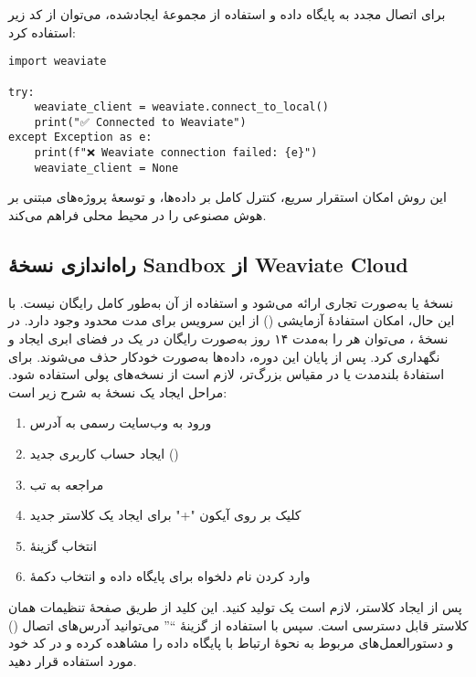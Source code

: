 \documentclass{article}
\begin{document}
برای اتصال مجدد به پایگاه داده و استفاده از مجموعهٔ ایجادشده، می‌توان از کد زیر استفاده کرد:

\begin{latin}
\begin{lstlisting}
import weaviate

try:
    weaviate_client = weaviate.connect_to_local()
    print("✅ Connected to Weaviate")
except Exception as e:
    print(f"❌ Weaviate connection failed: {e}")
    weaviate_client = None
\end{lstlisting}
\end{latin}

این روش امکان استقرار سریع، کنترل کامل بر داده‌ها، و توسعهٔ پروژه‌های مبتنی بر هوش مصنوعی را در محیط محلی فراهم می‌کند.
\subsection{راه‌اندازی نسخهٔ Sandbox از Weaviate Cloud}
نسخهٔ  یا  به‌صورت تجاری ارائه می‌شود و استفاده از آن به‌طور کامل رایگان نیست.
با این حال، امکان استفادهٔ آزمایشی () از این سرویس برای مدت محدود وجود دارد.
در نسخهٔ ، می‌توان هر  را به‌مدت ۱۴ روز به‌صورت رایگان در یک  در فضای ابری  ایجاد و نگهداری کرد.
پس از پایان این دوره، داده‌ها به‌صورت خودکار حذف می‌شوند.
برای استفادهٔ بلندمدت یا در مقیاس بزرگ‌تر، لازم است از نسخه‌های پولی  استفاده شود.
مراحل ایجاد یک نسخهٔ  به شرح زیر است:
\begin{enumerate}
\item ورود به وب‌سایت رسمی  به آدرس 
\item ایجاد حساب کاربری جدید ()
\item مراجعه به تب 
\item کلیک بر روی آیکون "+" برای ایجاد یک کلاستر جدید
\item انتخاب گزینهٔ 
\item وارد کردن نام دلخواه برای پایگاه داده و انتخاب دکمهٔ 
\end{enumerate}

پس از ایجاد کلاستر، لازم است یک  تولید کنید.
این کلید از طریق صفحهٔ تنظیمات همان کلاستر قابل دسترسی است.
سپس با استفاده از گزینهٔ ``'' می‌توانید آدرس‌های اتصال () و دستورالعمل‌های مربوط به نحوهٔ ارتباط با پایگاه داده را مشاهده کرده و در کد خود مورد استفاده قرار دهید.
\end{document}

